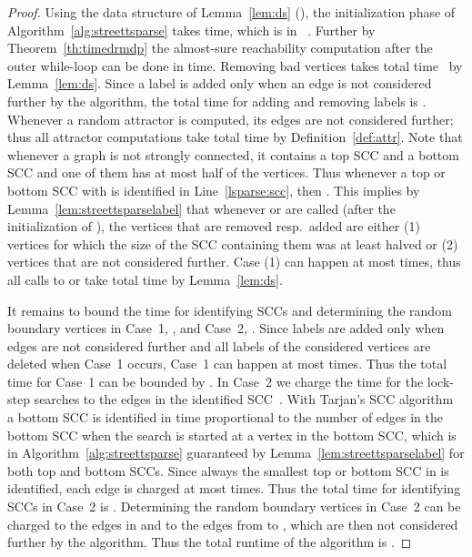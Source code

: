 \documentclass[11pt,letterpaper]{article}
\newcommand{\lu}{\textup{(}}
\newcommand{\ru}{\textup{)}\xspace}
\newcommand{\upbr}[1]{\lu #1\ru}
\begin{document}
\begin{proof}
	Using the data structure of Lemma~\ref{lem:ds} (\cite{HenzingerT96}),
	the initialization phase of Algorithm~\ref{alg:streettsparse} takes
	 time, which is in ~\cite{ChatterjeeH14}.
	Further by Theorem~\ref{th:timedrmdp} the almost-sure reachability computation
	after the outer while-loop can be done in  time. 
	Removing bad vertices takes total time~ by Lemma~\ref{lem:ds}. 
	Since a label is added only when an edge is not considered further by the 
	algorithm, the total time for adding and removing labels is .
	Whenever a random attractor is computed, its edges are not considered further;
	thus all attractor computations take  total time by Definition~\ref{def:attr}.
	Note that whenever a graph is not strongly connected, it contains a top SCC and 
	a bottom SCC and one of them has at most half of the vertices. Thus whenever 
	a top or bottom SCC  with  is identified in 
	Line~\ref{lsparse:scc}, then .
	This implies by Lemma~\ref{lem:streettsparselabel}
	that whenever  or  are called (after the
	initialization of ), the vertices that are removed resp.\ added are either
	\upbr{1} vertices for which the size of the SCC containing them was at least halved
	or \upbr{2} vertices that are not considered further. Case \upbr{1} can happen
	at most  times, thus all calls to  or  take
	total time  by Lemma~\ref{lem:ds}.
	
	It remains to bound the time for identifying SCCs and determining the
	random boundary vertices  in
	Case~1, ,
	and Case~2, .
	Since labels are added only when edges are not considered further and all 
	labels of the considered vertices are deleted when Case~1 occurs, Case~1 can 
	happen at most  times. Thus the total time for Case~1 can be 
	bounded by . In Case~2 we charge the time for the 
	 lock-step searches to the edges in the identified 
	SCC~. With Tarjan's SCC algorithm~\cite{T72} a bottom SCC is identified 
	in time proportional to the number of edges in the bottom SCC when the search
	is started at a vertex in the bottom SCC, which is in 
	Algorithm~\ref{alg:streettsparse} guaranteed by Lemma~\ref{lem:streettsparselabel}
	for both top and bottom SCCs. Since always the smallest top or bottom SCC in 
	 is identified, each edge is charged at most  times.
	Thus the total time for identifying SCCs in Case~2 is .
	Determining the random boundary vertices  in Case~2 can be charged to 
	the edges in 
	and to the edges from  to , which are then not considered 
	further by the algorithm. Thus the total runtime of the algorithm is 
	.
\end{proof}
\end{document}
